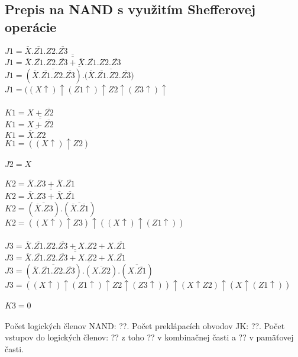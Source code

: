 \documentclass{article}
\begin{document}
\subsection{Prepis na NAND s využitím Shefferovej operácie}
$J1 = \overline{X}.\overline{Z1}.Z2.\overline{Z3}$\\
$J1 = \overline{\overline{\overline{X}.\overline{Z1}.Z2.\overline{Z3}+\overline{X}.\overline{Z1}.Z2.\overline{Z3}}}$\\
$J1 = \overline{(\overline{\overline{X}.\overline{Z1}.Z2.\overline{Z3}}).(\overline{\overline{X}.\overline{Z1}.Z2.\overline{Z3})}}$\\
$J1 = ((X\uparrow)\uparrow(Z1\uparrow)\uparrow Z2\uparrow(Z3\uparrow)\uparrow$\\\\
$K1 = X +\overline{Z2}$\\
$K1 = \overline{\overline{X +\overline{Z2}}}$\\
$K1 = \overline{\overline{X}.Z2}$\\
$K1 = ((X\uparrow)\uparrow Z2)$\\\\
$J2 = X$\\\\
$K2 = \overline{X}.Z3+\overline{X}.\overline{Z1}$\\
$K2 = \overline{\overline{\overline{X}.Z3+\overline{X}.\overline{Z1}}}$\\
$K2 = \overline{(\overline{\overline{X}.Z3}).(\overline{\overline{X}.\overline{Z1}})}$\\
$K2 = ((X\uparrow)\uparrow Z3)\uparrow((X\uparrow)\uparrow(Z1\uparrow))$\\\\
$J3 = \overline{X}.\overline{Z1}.Z2.\overline{Z3}+X.Z2+X.\overline{Z1}$\\
$J3 = \overline{ \overline{ \overline{X}.\overline{Z1}.Z2.\overline{Z3}+X.Z2+X.\overline{Z1}}}$\\
$J3 = \overline{(\overline{\overline{X}.\overline{Z1}.Z2.\overline{Z3}}).(\overline{X.Z2}).(\overline{X.\overline{Z1}})}$\\
$J3 = ((X\uparrow)\uparrow(Z1\uparrow)\uparrow Z2\uparrow(Z3\uparrow))\uparrow(X\uparrow Z2)\uparrow(X\uparrow(Z1\uparrow))$\\\\
$K3 = 0$\\\\
Počet logických členov NAND: ??. 
Počet preklápacích obvodov JK: ??. 
Počet vstupov do logických členov: ?? z toho ?? v kombinačnej časti a ?? v pamäťovej časti.
\end{document}
